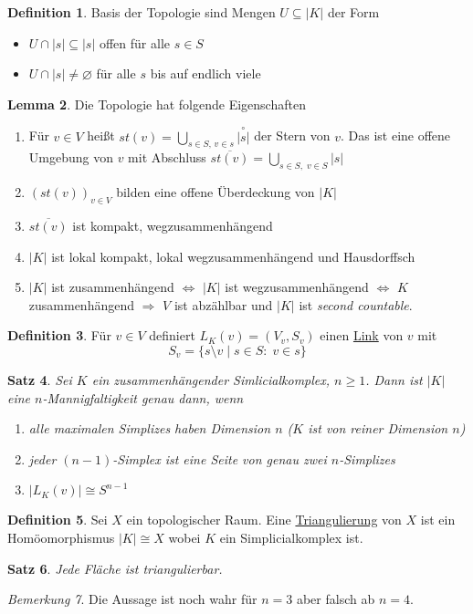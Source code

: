 \documentclass[a4paper, 12pt]{article}
\theoremstyle{plain}
\newtheorem{theorem}{Satz}[section] %
\theoremstyle{definition}
\newtheorem{definition}[theorem]{Definition} %
\theoremstyle{lemma}
\newtheorem{lemma}[theorem]{Lemma}
\theoremstyle{remark}
\newtheorem{remark}[theorem]{Bemerkung}
\theoremstyle{corollary}
\theoremstyle{example}
\begin{document}
	\begin{definition}
		Basis der Topologie sind Mengen $U \subseteq \left|K\right|$ der Form \begin{itemize}
			\item $U \cap \left|s\right| \subseteq \left|s\right|$ offen für alle $s \in S$
			\item $U \cap \left|s\right| \neq \varnothing$ für alle $s$ bis auf endlich viele
		\end{itemize}
	\end{definition}
	\begin{lemma}
		Die Topologie hat folgende Eigenschaften
		\begin{enumerate}
			\item Für $v \in V$ heißt $st(v) = \bigcup_{s \in S, \, v \in s}  \overset{\circ}{\left|s\right|}$ der Stern von $v$. Das ist eine offene Umgebung von $v$ mit Abschluss $\overline{st(v)} = \bigcup_{s \in S, \; v \in S} \left|s\right|$
			\item $(st(v))_{v \in V}$ bilden eine offene Überdeckung von $\left|K\right|$ 
			\item $\overline{st(v)}$ ist kompakt, wegzusammenhängend 
			\item $\left|K\right|$ ist lokal kompakt, lokal wegzusammenhängend und Hausdorffsch
			\item $\left|K\right|$ ist zusammenhängend $\Leftrightarrow$ $\left|K\right|$ ist wegzusammenhängend $\Leftrightarrow$ $K$ zusammenhängend $\Rightarrow$ $V$ ist abzählbar und $\left|K\right|$ ist \textit{second countable}.
		\end{enumerate}
	\end{lemma}
	\begin{definition}
		Für $v \in V$ definiert $L_K(v) = (V_v, S_v)$ einen \underline{Link} von $v$ mit \[S_v = \{s\setminus v \mid s \in S : \; v \in s\}\]
	\end{definition}
	\begin{theorem}
		Sei $K$ ein zusammenhängender Simlicialkomplex, $n \geq 1$. Dann ist $\left|K\right|$ eine $n$-Mannigfaltigkeit genau dann, wenn \begin{enumerate}
			\item alle maximalen Simplizes haben Dimension $n$ ($K$ ist von reiner Dimension $n$)
			\item jeder $(n-1)$-Simplex ist eine Seite von genau zwei $n$-Simplizes
			\item $\left|L_K(v)\right| \cong S^{n-1}$
		\end{enumerate}
	\end{theorem}
	\begin{definition}
		Sei $X$ ein topologischer Raum. Eine \underline{Triangulierung} von $X$ ist ein Homöomorphismus $\left|K\right| \cong X$ wobei $K$ ein Simplicialkomplex ist.
	\end{definition}
	\begin{theorem}
		Jede Fläche ist triangulierbar.
	\end{theorem}
	\begin{remark}
		Die Aussage ist noch wahr für $n=3$ aber falsch ab $n=4$.
	\end{remark}
\end{document}
